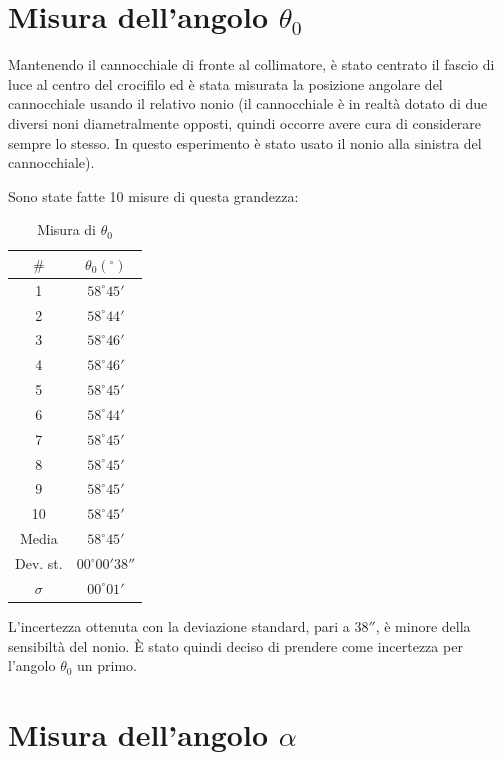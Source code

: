 \documentclass{article}
\begin{document}
\section{Misura dell'angolo $\theta _0$}

Mantenendo il cannocchiale di fronte al collimatore, è stato centrato il fascio di luce al centro del crocifilo ed è stata misurata la posizione angolare del cannocchiale usando il relativo nonio (il cannocchiale è in realtà dotato di due diversi noni diametralmente opposti, quindi occorre avere cura di considerare sempre lo stesso. In questo esperimento è stato usato il nonio alla sinistra del cannocchiale).

Sono state fatte 10 misure di questa grandezza:

\vspace{5mm}

\begin{table}[h!]
\centering
\begin{tabular}{ | c | c | }
  \hline
   $\#$ & $\theta _0 (^{\circ})$ \\
  \hline
  1 & $58^{\circ} 45'$ \\
  2 & $58^{\circ} 44'$ \\
  3 & $58^{\circ} 46'$ \\
  4 & $58^{\circ} 46'$ \\
  5 & $58^{\circ} 45'$ \\
  6 & $58^{\circ} 44'$ \\
  7 & $58^{\circ} 45'$ \\
  8 & $58^{\circ} 45'$ \\
  9 & $58^{\circ} 45'$ \\
  10 & $58^{\circ} 45'$ \\
  \hline
  Media & $58^{\circ} 45'$ \\
  Dev. st. & $00^{\circ} 00' 38''$ \\
  $\sigma$ & $00^{\circ} 01'$ \\
  \hline
\end{tabular}
  \caption{Misura di $\theta _0$}
  \label{table:1}
\end{table}

L'incertezza ottenuta con la deviazione standard, pari a $38''$, è minore della sensibiltà del nonio. È stato quindi deciso di prendere come incertezza per l'angolo $\theta _0$ un primo.

\section{Misura dell'angolo $\alpha$}
\end{document}
